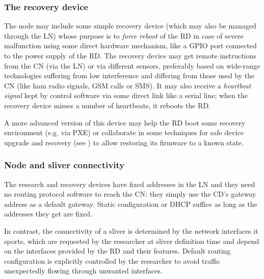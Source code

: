 \documentclass[conference]{IEEEtran}
\begin{document}
\subsubsection{The recovery device}

The node may include some simple recovery device (which may also be managed
through the LN) whose purpose is to \emph{force reboot} of the RD in case of
severe malfunction using some direct hardware mechanism, like a GPIO port
connected to the power supply of the RD.  The recovery device may get remote
instructions from the CN (via the LN) or via different sensors, preferably
based on wide-range technologies suffering from low interference and differing
from those used by the CN (like ham radio signals, GSM calls or SMS).  It may
also receive a \emph{heartbeat signal} kept by control software via some
direct link like a serial line; when the recovery device misses a number of
heartbeats, it reboots the RD.

A more advanced version of this device may help the RD boot some recovery
environment (e.g. via PXE) or collaborate in some techniques for safe device
upgrade and recovery (see \cite{van12}) to allow restoring its firmware to a
known state.


\subsubsection{Node and sliver connectivity}

The research and recovery devices have fixed addresses in the LN and they need
no routing protocol software to reach the CN: they simply use the CD's gateway
address as a default gateway.  Static configuration or DHCP suffice as long as
the addresses they get are fixed.

In contrast, the connectivity of a sliver is determined by the network
interfaces it sports, which are requested by the researcher at sliver
definition time and depend on the interfaces provided by the RD and their
features.  Default routing configuration is explicitly controlled by the
researcher to avoid traffic unexpectedly flowing through unwanted interfaces.
\end{document}
